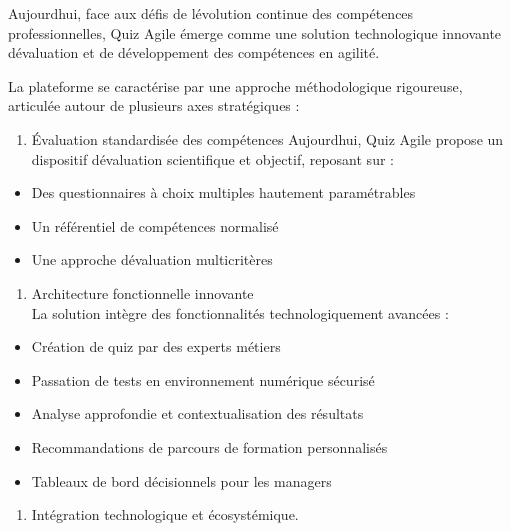 \documentclass[12pt,a4paper,twoside]{report}
\begin{document}
Aujourd\textquotesingle hui, face aux défis de
l\textquotesingle évolution continue des compétences professionnelles,
Quiz Agile émerge comme une solution technologique innovante
d\textquotesingle évaluation et de développement des compétences en
agilité.

La plateforme se caractérise par une approche méthodologique rigoureuse,
articulée autour de plusieurs axes stratégiques :

\begin{enumerate}
\def\labelenumi{\arabic{enumi}.}
\item
  Évaluation standardisée des compétences Aujourd\textquotesingle hui,
  Quiz Agile propose un dispositif d\textquotesingle évaluation
  scientifique et objectif, reposant sur :
\end{enumerate}

\begin{itemize}
\item
  Des questionnaires à choix multiples hautement paramétrables
\item
  Un référentiel de compétences normalisé
\item
  Une approche d\textquotesingle évaluation multicritères
\end{itemize}

\begin{enumerate}
\def\labelenumi{\arabic{enumi}.}
\setcounter{enumi}{1}
\item
  Architecture fonctionnelle innovante~\\
  La solution intègre des fonctionnalités technologiquement avancées :
\end{enumerate}

\begin{itemize}
\item
  Création de quiz par des experts métiers
\item
  Passation de tests en environnement numérique sécurisé
\item
  Analyse approfondie et contextualisation des résultats
\item
  Recommandations de parcours de formation personnalisés
\item
  Tableaux de bord décisionnels pour les managers
\end{itemize}

\begin{enumerate}
\def\labelenumi{\arabic{enumi}.}
\setcounter{enumi}{2}
\item
  Intégration technologique et écosystémique.
\end{enumerate}
\end{document}
